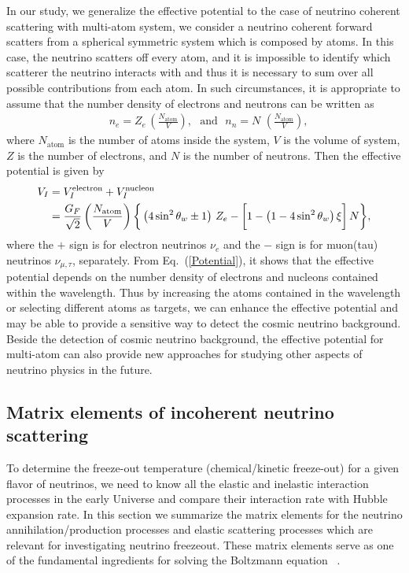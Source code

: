 In our study, we generalize the effective potential to the case of neutrino coherent scattering with multi-atom system, we consider a neutrino coherent forward scatters from a spherical symmetric system which is composed by atoms. In this case, the neutrino scatters off every atom, and it is impossible to identify which scatterer the neutrino interacts with and thus it is necessary to sum over all possible contributions from each atom. In such circumstances, it is appropriate to assume that the number density of electrons and neutrons can be written as
\begin{align}
&n_e=Z_e\,\left(\frac{N_\mathrm{atom}}{V}\right),\,\,\,\,\mathrm{and}\,\,\,\,n_n=N\,\,\left(\frac{N_\mathrm{atom}}{V}\right),
\end{align}
where $N_\mathrm{atom}$ is the number of atoms inside the system, $V$ is the volume of system, $Z$ is the number of electrons, and $N$ is the number of neutrons.
Then the effective potential is given by
\begin{align}
\label{Potential}
V_{I}&=V_I^{\mathrm{electron}}+V_I^{\mathrm{nucleon}}\notag\\&=\frac{G_F}{\sqrt{2}}\left(\frac{N_\mathrm{atom}}{V}\right)\bigg\{\left(4\sin^2\theta_w\pm1\right)\,Z_e-\bigg[1-\left(1-4\sin^2\theta_w\right)\xi\bigg]\,N\bigg\},
\end{align}
where the $+$ sign is for electron neutrinos $\nu_e$ and the $-$ sign is for muon(tau) neutrinos $\nu_{\mu,\tau}$, separately. 
From Eq.~(\ref{Potential}), it shows that the effective potential depends on the number density of electrons and nucleons contained within the wavelength. 
Thus by increasing the  atoms contained in the wavelength or selecting different atoms as targets, we can enhance the effective potential and may be able to provide a sensitive way to detect the cosmic neutrino background. Beside the detection of cosmic neutrino background, the effective potential for multi-atom can also provide new approaches for studying other aspects of neutrino physics in the future.

\subsection{Matrix elements of incoherent neutrino scattering}

To determine the freeze-out temperature (chemical/kinetic freeze-out) for a given flavor of neutrinos, we need to know all the elastic and inelastic interaction processes in the early Universe and compare their interaction rate with Hubble expansion rate. In this section we summarize the matrix elements for the neutrino annihilation/production processes and elastic scattering processes which are relevant for investigating neutrino freezeout. These matrix elements serve as one of the fundamental ingredients for solving the Boltzmann equation ~\cite{Birrell:2014uka}.

